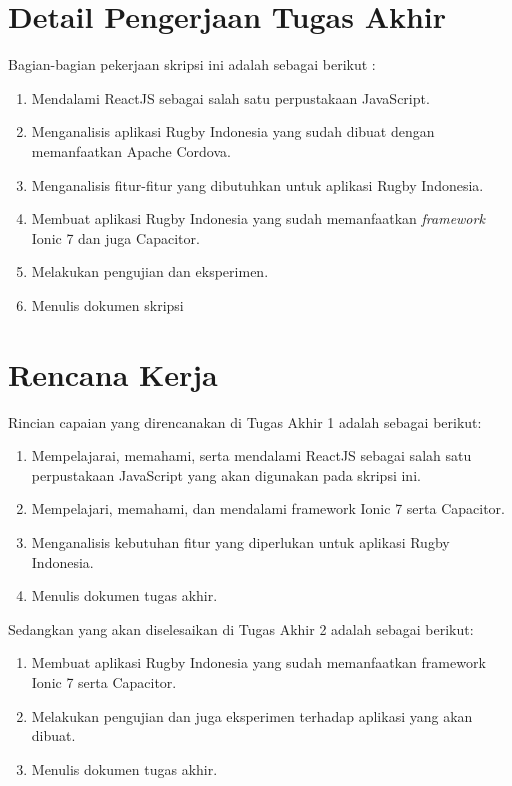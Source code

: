 \documentclass[a4paper,twoside]{article}
\begin{document}
\section{Detail Pengerjaan Tugas Akhir}
Bagian-bagian pekerjaan skripsi ini adalah sebagai berikut :
\begin{enumerate}
    \item Mendalami ReactJS sebagai salah satu perpustakaan JavaScript.
    \item Menganalisis aplikasi Rugby Indonesia yang sudah dibuat dengan memanfaatkan Apache Cordova.
    \item Menganalisis fitur-fitur yang dibutuhkan untuk aplikasi Rugby Indonesia.
    \item Membuat aplikasi Rugby Indonesia yang sudah memanfaatkan \textit{framework} Ionic 7 dan juga Capacitor.
    \item Melakukan pengujian dan eksperimen.
    \item Menulis dokumen skripsi
\end{enumerate}

\section{Rencana Kerja}
Rincian capaian yang direncanakan di Tugas Akhir 1 adalah sebagai berikut:
\begin{enumerate}
    \item Mempelajarai, memahami, serta mendalami ReactJS sebagai salah satu perpustakaan JavaScript yang akan digunakan pada skripsi ini.
    \item Mempelajari, memahami, dan mendalami framework Ionic 7 serta Capacitor.
    \item Menganalisis kebutuhan fitur yang diperlukan untuk aplikasi Rugby Indonesia.
    \item Menulis dokumen tugas akhir.
\end{enumerate}

Sedangkan yang akan diselesaikan di Tugas Akhir 2 adalah sebagai berikut:
\begin{enumerate}
    \item Membuat aplikasi Rugby Indonesia yang sudah memanfaatkan framework Ionic 7 serta Capacitor.
    \item Melakukan pengujian dan juga eksperimen terhadap aplikasi yang akan dibuat.
    \item Menulis dokumen tugas akhir.
\end{enumerate}
\end{document}
